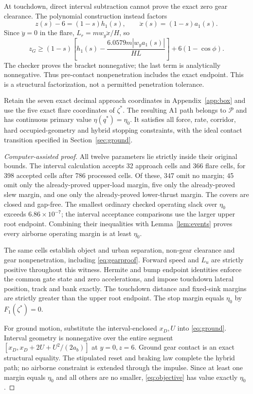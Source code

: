 At touchdown, direct interval subtraction cannot prove the exact zero gear clearance. The polynomial construction instead factors
\begin{equation}\label{eq:gear-factor}
 z(s)-6=(1-s)h_1(s),\qquad \ddot x(s)=(1-s)a_1(s).
\end{equation}
Since $\ddot y=0$ in the flare, $L_r=mw_y\ddot x/H$, so
\begin{equation}\label{eq:gearproof}
 z_G\geq(1-s)\left[h_1(s)-\frac{6.0579m|w_ya_1(s)|}{HL}\right]
       +6(1-\cos\phi).
\end{equation}
The checker proves the bracket nonnegative; the last term is analytically nonnegative. Thus pre-contact nonpenetration includes the exact endpoint. This is a structural factorization, not a permitted penetration tolerance.

\begin{theorem}\label{thm:feasible}
Retain the seven exact decimal approach coordinates in Appendix~\ref{app:box} and use the five exact flare coordinates of $\zeta^*$. The resulting A1 path belongs to $\mathcal P$ and has continuous primary value $\eta(q^*)=\eta_0$. It satisfies all force, rate, corridor, hard occupied-geometry and hybrid stopping constraints, with the ideal contact transition specified in Section~\ref{sec:ground}.
\end{theorem}
\begin{proof}[Computer-assisted proof]
All twelve parameters lie strictly inside their original bounds. The interval calculation accepts 32 approach cells and 366 flare cells, for 398 accepted cells after 786 processed cells. Of these, 347 omit no margin; 45 omit only the already-proved upper-load margin, five only the already-proved slew margin, and one only the already-proved lower-thrust margin. The covers are closed and gap-free. The smallest ordinary checked operating slack over $\eta_0$ exceeds $6.86\times10^{-7}$; the interval acceptance comparisons use the larger upper root endpoint. Combining their inequalities with Lemma~\ref{lem:events} proves every airborne operating margin is at least $\eta_0$.

The same cells establish object and urban separation, non-gear clearance and gear nonpenetration, including \eqref{eq:gearproof}. Forward speed and $L_u$ are strictly positive throughout this witness. Hermite and bump endpoint identities enforce the common gate state and zero accelerations, and impose touchdown lateral position, track and bank exactly. The touchdown distance and fixed-sink margins are strictly greater than the upper root endpoint. The stop margin equals $\eta_0$ by $F_1(\zeta^*)=0$.

For ground motion, substitute the interval-enclosed $x_D,U$ into \eqref{eq:ground}. Interval geometry is nonnegative over the entire segment $[x_D,x_D+2U+U^2/(2a_b)]$ at $y=0,z=6$. Ground gear contact is an exact structural equality. The stipulated reset and braking law complete the hybrid path; no airborne constraint is extended through the impulse. Since at least one margin equals $\eta_0$ and all others are no smaller, \eqref{eq:objective} has value exactly $\eta_0$.
\end{proof}

